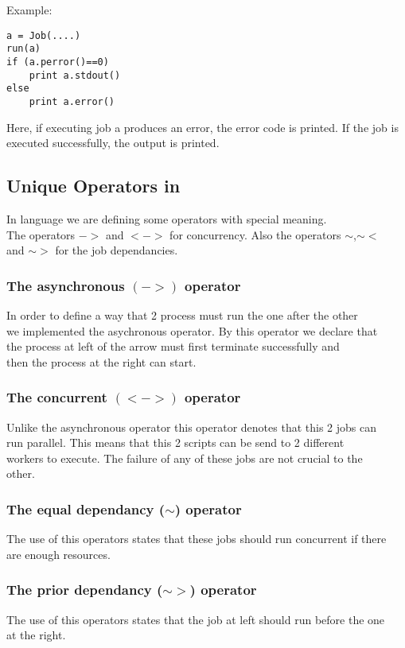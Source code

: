 Example:
\begin{verbatim}
a = Job(....)
run(a)
if (a.perror()==0)
    print a.stdout()
else
    print a.error()
\end{verbatim}

Here, if executing job a produces an error, the error code is printed. If the job is executed successfully, the output is printed.



\subsection*{Unique Operators in \lang{}}

In \lang{} language we are defining some operators with special meaning.\\
The operators $->$ and $<->$ for concurrency. Also the operators $\sim$,$\sim<$\\and $\sim>$ for the job dependancies.\\
\subsubsection*{The asynchronous $(->)$ operator}
In order to define a way that 2 process must run the one after the other\\
we implemented the asychronous operator. By this operator we declare that\\
the process at left of the arrow must first terminate successfully and\\
then the process at the right can start.
\subsubsection*{The concurrent $(<->)$ operator}
Unlike the asynchronous operator this operator denotes that this 2 jobs can\\
run parallel. This means that this 2 scripts can be send to 2 different\\
workers to execute. The failure of any of these jobs are not crucial to the\\
other.
\subsubsection*{The equal dependancy ($\sim$) operator}
The use of this operators states that these jobs should run concurrent if there\\
are enough resources.
\subsubsection*{The prior dependancy ($\sim>$) operator}
The use of this operators states that the job at left should run before the one\\
at the right.
